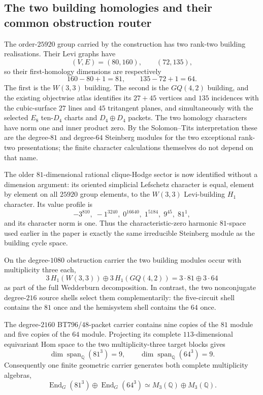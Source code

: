 \subsection{The two building homologies and their common obstruction router}
The order-$25920$ group carried by the construction has two rank-two building
realisations.  Their Levi graphs have
\[
 (V,E)=(80,160),\qquad (72,135),
\]
so their first-homology dimensions are respectively
\[
 160-80+1=81,\qquad 135-72+1=64.
\]
The first is the $W(3,3)$ building.  The second is the $GQ(4,2)$ building,
and the existing objectwise atlas identifies its $27+45$ vertices and $135$
incidences with the cubic-surface $27$ lines and $45$ tritangent planes, and
simultaneously with the selected $E_8$ ten-$D_4$ charts and $D_4\oplus D_4$
packets.  The two homology characters have norm one and inner product zero.
By the Solomon--Tits interpretation these are the degree-$81$ and degree-$64$
Steinberg modules for the two exceptional rank-two presentations; the finite
character calculations themselves do not depend on that name.

The older $81$-dimensional rational clique-Hodge sector is now identified
without a dimension argument: its oriented simplicial Lefschetz character is
equal, element by element on all $25920$ group elements, to the $W(3,3)$
Levi-building $H_1$ character.  Its value profile is
\[
 -3^{810},\;-1^{3240},\;0^{16640},\;1^{5184},\;9^{45},\;81^1,
\]
and its character norm is one.  Thus the characteristic-zero harmonic
$81$-space used earlier in the paper is exactly the same irreducible
Steinberg module as the building cycle space.

On the degree-$1080$ obstruction carrier the two building modules occur with
multiplicity three each,
\[
 3\,H_1(W(3,3))\oplus3\,H_1(GQ(4,2))
 =3\cdot81\oplus3\cdot64
\]
as part of the full Wedderburn decomposition.  In contrast, the two
nonconjugate degree-$216$ source shells select them complementarily: the
five-circuit shell contains the $81$ once and the hemisystem shell contains
the $64$ once.

The degree-$2160$ BT796/$48$-packet carrier contains nine copies of the
$81$ module and five copies of the $64$ module.  Projecting its complete
$113$-dimensional equivariant Hom space to the two multiplicity-three target
blocks gives
\[
 \dim\operatorname{span}_{\mathbb Q}(81^3)=9,
 \qquad
 \dim\operatorname{span}_{\mathbb Q}(64^3)=9.
\]
Consequently one finite geometric carrier generates both complete multiplicity
algebras,
\[
 \operatorname{End}_G(81^3)\oplus\operatorname{End}_G(64^3)
 \simeq M_3(\mathbb Q)\oplus M_3(\mathbb Q).
\]

